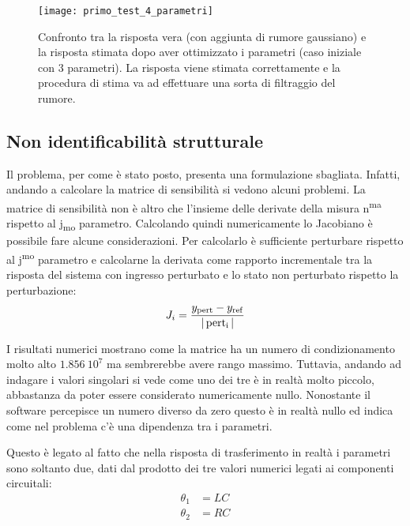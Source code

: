 \begin{figure}[bt]
	\centering
	\texttt{[image: primo\_test\_4\_parametri]}
	\caption{Confronto tra la risposta vera (con aggiunta di rumore gaussiano) e la risposta stimata dopo aver ottimizzato i parametri (caso iniziale con 3 parametri). La risposta viene stimata correttamente e la procedura di stima va ad effettuare una sorta di filtraggio del rumore.}
	\label{fig:primo_test_4_parametri}
\end{figure}

\subsection{Non identificabilità strutturale}

Il problema, per come è stato posto, presenta una formulazione sbagliata. Infatti, andando a calcolare la matrice di sensibilità si vedono alcuni problemi. La matrice di sensibilità non è altro che l'insieme delle derivate della misura n\textsuperscript{ma} rispetto al j\textsubscript{mo} parametro. Calcolando quindi numericamente lo Jacobiano è possibile fare alcune considerazioni. 
Per calcolarlo è sufficiente perturbare rispetto al j\textsuperscript{mo} parametro e calcolarne la derivata come rapporto incrementale tra la risposta del sistema con ingresso perturbato e lo stato non perturbato rispetto la perturbazione:
\begin{equation}
	J_{i}={y_{\operatorname{pert}}-y_{\operatorname{ref}}\over |\operatorname{pert_i}|}
	\label{eq:J}
\end{equation}

I risultati numerici mostrano come la matrice ha un numero di condizionamento molto alto $1.856 \:10^7$ ma sembrerebbe avere rango massimo. Tuttavia, andando ad indagare i valori singolari si vede come uno dei tre è in realtà molto piccolo, abbastanza da poter essere considerato numericamente nullo. Nonostante il software percepisce un numero diverso da zero questo è in realtà nullo ed indica come nel problema c'è una dipendenza tra i parametri.

Questo è legato al fatto che nella risposta di trasferimento in realtà i parametri sono soltanto due, dati dal prodotto dei tre valori numerici legati ai componenti circuitali:
\begin{equation}
	\begin{aligned}
		\theta_1&=LC\\
		\theta_2&=RC
	\end{aligned}
\end{equation}

